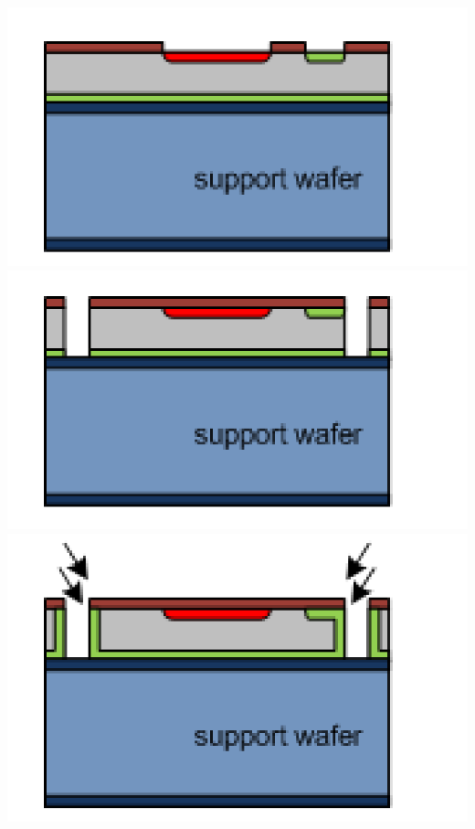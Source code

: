 \begin{frame}
\begin{columns}
    \centering
    \includegraphics[width=\textwidth]{../figures/ActiveEdge/advacamProcess/wafer_4.pdf}\\
    \includegraphics[width=\textwidth]{../figures/ActiveEdge/advacamProcess/wafer_5.pdf}\\
    \includegraphics[width=\textwidth]{../figures/ActiveEdge/advacamProcess/wafer_6.pdf}


\end{columns}
\end{frame}
